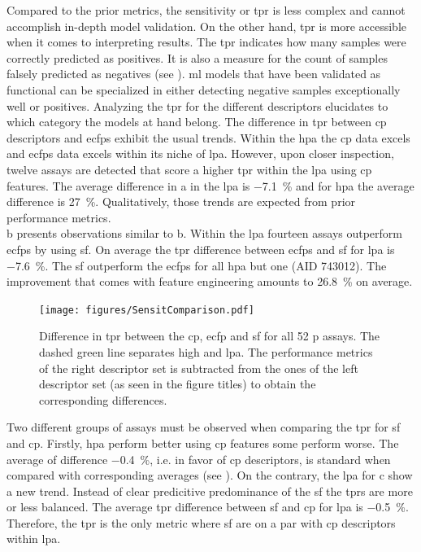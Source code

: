 Compared to the prior metrics, the sensitivity or \acf{tpr} is less complex and cannot accomplish in-depth model validation. On the other hand, \ac{tpr} is more accessible when it comes to interpreting results. The \ac{tpr} indicates how many samples were correctly predicted as positives. It is also a measure for the count of samples falsely predicted as negatives (see ). \ac{ml} models that have been validated as functional can be specialized in either detecting negative samples exceptionally well or positives. Analyzing the \ac{tpr} for the different descriptors elucidates to which category the models at hand belong.
The difference in \ac{tpr} between \ac{cp} descriptors and \acp{ecfp} exhibit the usual trends. Within the \acl{hpa} the \ac{cp} data excels and \acp{ecfp} data excels within its niche of \acl{lpa}. However, upon closer inspection, twelve assays are detected that score a higher \ac{tpr} within the \acl{lpa} using \ac{cp} features. The average difference in a in the \acl{lpa} is \SI{-7.1}{\percent} and for \acl{hpa} the average difference is \SI{27}{\percent}. Qualitatively, those trends are expected from prior performance metrics.\\
b presents observations similar to b. Within the \acl{lpa} fourteen assays outperform \acp{ecfp} by using \acl{sf}. On average the \ac{tpr} difference between \acp{ecfp} and \acl{sf} for \acl{lpa} is \SI{-7.6}{\percent}. The \acl{sf} outperform the \acp{ecfp} for all \acl{hpa} but one (AID 743012). The improvement that comes with feature engineering amounts to \SI{26.8}{\percent} on average.\\
\begin{figure}[H]
	\centering
	\texttt{[image: figures/SensitComparison.pdf]}
	\caption[Difference in \acl{tpr} Between the \ac{cp}, \ac{ecfp} and \ac{sf}]{Difference in \acl{tpr} between the \ac{cp}, \ac{ecfp} and \acf{sf} for all 52 \acl{p} assays. The dashed green line separates high and \acl{lpa}. The performance metrics of the right descriptor set is subtracted from the ones of the left descriptor set (as seen in the figure titles) to obtain the corresponding differences.}
	\label{fig:diffsensit}
\end{figure}\noindent
Two different groups of assays must be observed when comparing the \ac{tpr} for \acl{sf} and \ac{cp}. Firstly, \acl{hpa} perform better using \ac{cp} features some perform worse. The average of difference \SI{-0.4}{\percent}, i.e. in favor of \ac{cp} descriptors, is standard when compared with corresponding averages (see ). On the contrary, the \acl{lpa} for c show a new trend. Instead of clear predicitive predominance of the \acl{sf} the \acp{tpr} are more or less balanced. The average \ac{tpr} difference between \acl{sf} and \ac{cp} for \acl{lpa} is \SI{-0.5}{\percent}. Therefore, the \ac{tpr} is the only metric where \acl{sf} are on a par with \ac{cp} descriptors within \acl{lpa}.\\
